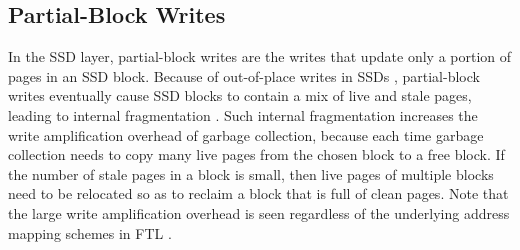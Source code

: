 

\subsection{Partial-Block Writes}

In the SSD layer, partial-block writes are the writes that update only a
portion of pages in an SSD block.  Because of out-of-place writes in SSDs
\cite{agrawal08}, 
partial-block writes eventually cause SSD blocks to
contain a mix of live and stale pages, leading to internal fragmentation
\cite{chen09}.  Such internal fragmentation increases the write amplification
overhead of garbage collection, because each time garbage collection needs to
copy many live pages from the chosen block to a free block. If the number of
stale pages in a block is small, then live pages of multiple blocks need to be
relocated so as to reclaim a block that is full of clean pages. Note that the
large write amplification overhead is seen regardless of the underlying
address mapping schemes in FTL \cite{min12}. 




